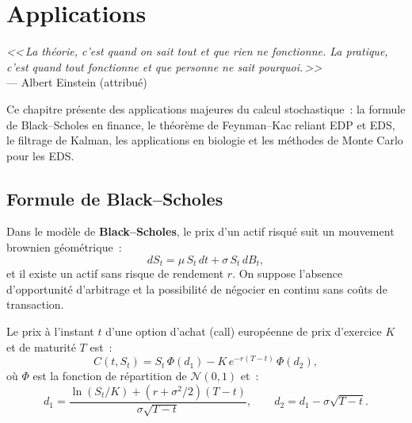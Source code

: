 \chapter{Applications}
\label{ch:applications}

\begin{center}
\textit{<<\,La th\'eorie, c'est quand on sait tout et que rien ne fonctionne.
La pratique, c'est quand tout fonctionne et que personne ne sait pourquoi.\,>>}\\[4pt]
--- Albert Einstein (attribu\'e)
\end{center}

\bigskip

Ce chapitre pr\'esente des applications majeures du calcul stochastique~:
la formule de Black--Scholes en finance, le th\'eor\`eme de Feynman--Kac
reliant EDP et EDS, le filtrage de Kalman, les applications en biologie
et les m\'ethodes de Monte Carlo pour les EDS.

\section{Formule de Black--Scholes}
\label{sec:black_scholes}

\begin{definition}
Dans le mod\`ele de \textbf{Black--Scholes}, le prix d'un actif risqu\'e
suit un mouvement brownien g\'eom\'etrique~:
\[
  dS_t = \mu\, S_t\, dt + \sigma\, S_t\, dB_t,
\]
et il existe un actif sans risque de rendement $r$. On suppose
l'absence d'opportunit\'e d'arbitrage et la possibilit\'e de n\'egocier
en continu sans co\^uts de transaction.
\end{definition}

\begin{theoreme}
\label{thm:bs}
Le prix \`a l'instant $t$ d'une option d'achat (call) europ\'eenne de
prix d'exercice $K$ et de maturit\'e $T$ est~:
\[
  C(t, S_t) = S_t\,\Phi(d_1) - K\,e^{-r(T-t)}\,\Phi(d_2),
\]
o\`u $\Phi$ est la fonction de r\'epartition de $\mathcal{N}(0,1)$ et~:
\[
  d_1 = \frac{\ln(S_t/K) + (r + \sigma^2/2)(T-t)}{\sigma\sqrt{T-t}},
  \qquad d_2 = d_1 - \sigma\sqrt{T-t}.
\]
\end{theoreme}


